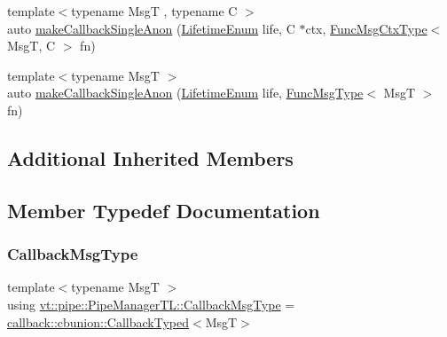 \begin{DoxyCompactItemize}
\item 
{\footnotesize template$<$typename MsgT , typename C $>$ }\\auto \hyperlink{structvt_1_1pipe_1_1_pipe_manager_t_l_ad0dca13f93e697e5c6329919ae77378f}{make\+Callback\+Single\+Anon} (\hyperlink{namespacevt_1_1pipe_acb42b284378c0fdac1d7c6335dc26f58}{Lifetime\+Enum} life, C $\ast$ctx, \hyperlink{structvt_1_1pipe_1_1_pipe_manager_base_a73fdf82ece0411b3dc644c99b763f7a9}{Func\+Msg\+Ctx\+Type}$<$ MsgT, C $>$ fn)
\item 
{\footnotesize template$<$typename MsgT $>$ }\\auto \hyperlink{structvt_1_1pipe_1_1_pipe_manager_t_l_aea9bdf9ea02e21ebd98393907ff432ea}{make\+Callback\+Single\+Anon} (\hyperlink{namespacevt_1_1pipe_acb42b284378c0fdac1d7c6335dc26f58}{Lifetime\+Enum} life, \hyperlink{structvt_1_1pipe_1_1_pipe_manager_base_aa54eee64ab32a27777a672d49eb861f4}{Func\+Msg\+Type}$<$ MsgT $>$ fn)
\end{DoxyCompactItemize}
\subsection*{Additional Inherited Members}


\subsection{Member Typedef Documentation}
\mbox{\label{structvt_1_1pipe_1_1_pipe_manager_t_l_af6fc2c17f1729fa06450441b0ee81cb1}} 
\subsubsection{\texorpdfstring{Callback\+Msg\+Type}{CallbackMsgType}}
{\footnotesize\ttfamily template$<$typename MsgT $>$ \\
using \hyperlink{structvt_1_1pipe_1_1_pipe_manager_t_l_af6fc2c17f1729fa06450441b0ee81cb1}{vt\+::pipe\+::\+Pipe\+Manager\+T\+L\+::\+Callback\+Msg\+Type} =  \hyperlink{structvt_1_1pipe_1_1callback_1_1cbunion_1_1_callback_typed}{callback\+::cbunion\+::\+Callback\+Typed}$<$MsgT$>$}

\mbox{\label{structvt_1_1pipe_1_1_pipe_manager_t_l_a456fdd18da932171fe8abab8bb213aa9}} 

